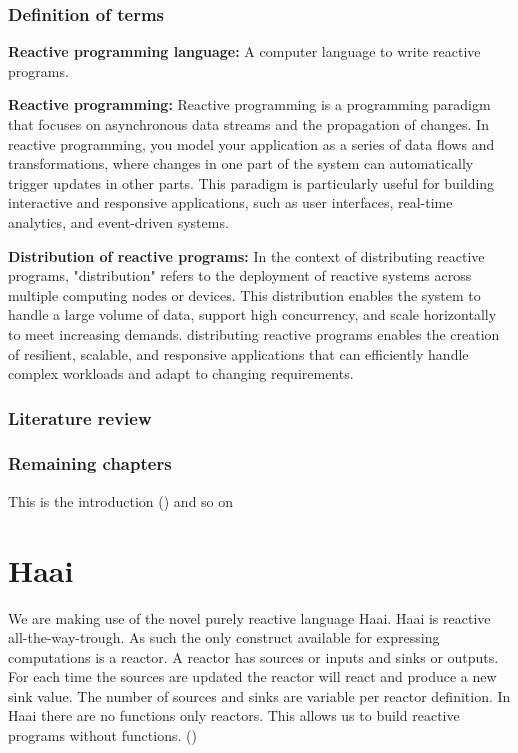 \documentclass[a4paper]{book}
\begin{document}
\subsection{Definition of terms}
\textbf{Reactive programming language: }
A computer language to write reactive programs.

\textbf{Reactive programming: }
Reactive programming is a programming paradigm that focuses on asynchronous data streams and the propagation of changes. In reactive programming, you model your application as a series of data flows and transformations, where changes in one part of the system can automatically trigger updates in other parts. This paradigm is particularly useful for building interactive and responsive applications, such as user interfaces, real-time analytics, and event-driven systems.

\textbf{Distribution of reactive programs: }In the context of distributing reactive programs, "distribution" refers to the deployment of reactive systems across multiple computing nodes or devices. This distribution enables the system to handle a large volume of data, support high concurrency, and scale horizontally to meet increasing demands. distributing reactive programs enables the creation of resilient, scalable, and responsive applications that can efficiently handle complex workloads and adapt to changing requirements.

\subsection{Literature review}



\subsection{Remaining chapters}
This is the introduction (\cite{oeyen2022reactive}) and so on 


\chapter{Haai}
We are making use of the novel purely reactive language Haai. Haai is reactive all-the-way-trough. As such the only construct available for expressing computations is a reactor. A reactor has sources or inputs and sinks or outputs. For each time the sources are updated the reactor will react and produce a new sink value. The number of sources and sinks are variable per reactor definition. In Haai there are no functions only reactors. This allows us to build reactive programs without functions. (\cite{oeyen_reactive_2024})
\end{document}
